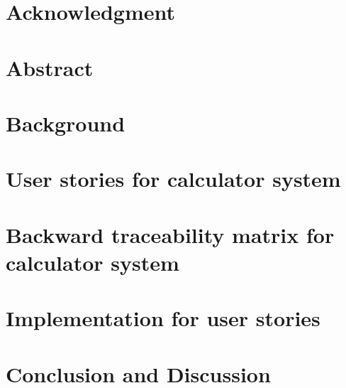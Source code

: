 \documentclass[a4paper,12pt]{report}
\begin{document}


\newpage

\newpage
{}

 \chapter*{\centering Acknowledgment}


\newpage
{}
\chapter*{\centering Abstract}


\newpage
{}
\tableofcontents

\newpage
{}
\chapter[Background]{Background}


\chapter{User stories for calculator system} 


\chapter{Backward traceability matrix for calculator system} 


\chapter{Implementation for user stories}


\chapter{Conclusion and Discussion}





\end{document}
